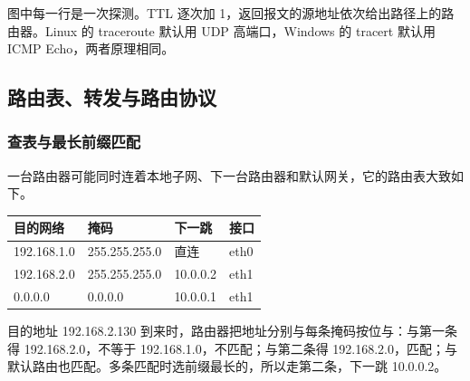 图中每一行是一次探测。TTL 逐次加 1，返回报文的源地址依次给出路径上的路由器。Linux 的 traceroute 默认用 UDP 高端口，Windows 的 tracert 默认用 ICMP Echo，两者原理相同。

\subsection{路由表、转发与路由协议}

\subsubsection{查表与最长前缀匹配}

一台路由器可能同时连着本地子网、下一台路由器和默认网关，它的路由表大致如下。

\begin{center}
\begin{tabular}{llll}
\hline
目的网络 & 掩码 & 下一跳 & 接口 \\
\hline
192.168.1.0 & 255.255.255.0 & 直连 & eth0 \\
192.168.2.0 & 255.255.255.0 & 10.0.0.2 & eth1 \\
0.0.0.0 & 0.0.0.0 & 10.0.0.1 & eth1 \\
\hline
\end{tabular}
\end{center}

目的地址 192.168.2.130 到来时，路由器把地址分别与每条掩码按位与：与第一条得 192.168.2.0，不等于 192.168.1.0，不匹配；与第二条得 192.168.2.0，匹配；与默认路由也匹配。多条匹配时选前缀最长的，所以走第二条，下一跳 10.0.0.2。

